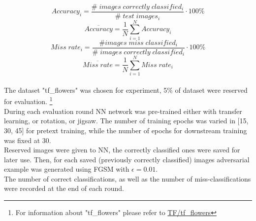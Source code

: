 \begin{equation}
    Accuracy_i = \frac{\# \; images \; correctly \; classified_i}{\# \; test \; images_i} \cdot 100 \%
\end{equation}
\begin{equation}
    \overline{Accuracy} = \frac{1}{N}  \sum_{i=1}^{N}{Accuracy_i}
\end{equation}
\begin{equation}
    Miss \; rate_i = \frac{\# images \; miss \; classified_i}{\# \; images \; correctly \; classified_i} \cdot 100 \%
\end{equation}
\begin{equation}
    \overline{Miss \; rate} = \frac{1}{N}  \sum_{i=1}^{N}{Miss \; rate_i}
\end{equation}
\\
The dataset "tf\_flowers" was chosen for experiment, 5\% of dataset were reserved for evaluation.
\footnote{For information about "tf\_flowers" please refer to \href{https://www.tensorflow.org/datasets/catalog/tf_flowers}{TF/tf\_flowers}}
\\
During each evaluation round NN network was pre-trained either with transfer learning, or rotation, or jigsaw.
The number of training epochs was varied in [15, 30, 45] for pretext training, while the number of epochs for downstream
training was fixed at 30.
\\
Reserved images were given to NN, the correctly classified ones were saved for later use.
Then, for each saved (previously correctly classified) images adversarial example was generated
using FGSM with $\epsilon = 0.01$.
\\
The number of correct classifications, as well as the number of miss-classifications were recorded at the end of each round.
